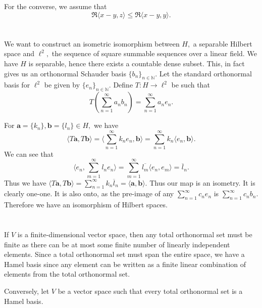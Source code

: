 \documentclass{article}
\begin{document}
For the converse, we assume that $$ \Re \langle x-y,z \rangle \leq  \Re \langle x-y,y \rangle. $$


\section{} %
\section{} %
\section{} %
We want to construct an isometric isomorphism between $H,$ a separable Hilbert space and $\ell^2,$ the sequence of square summable sequences over a linear 
field. We have $H$ is separable, hence there exists a countable dense subset. This, in fact gives us an orthonormal Schauder basis $\{b_n\}_{n \in 
\mathbb{N}}$. Let the standard orthonormal basis for $\ell^2$ be given by $\{e_n\}_{n \in \mathbb{N}}.$ Define $T:H \to \ell^2$ be such that 
$$T(\sum_{n=1}^{\infty}a_n b_n) = \sum_{n=1}^{\infty}a_n e_n.$$

For $\mathbf{a}= \{k_n\}, \mathbf{b}= \{l_n\} \in H,$ we have 
$$	\langle T\mathbf{a}, T \mathbf{b} \rangle =  \langle \sum_{n=1}^{\infty} k_ne_n, \mathbf{b} \rangle = \sum_{n=1}^{\infty} k_n \langle e_n, \mathbf{b} 
\rangle.$$ We can see that $$\langle e_n, \sum_{m=1}^{\infty} l_n e_n \rangle = \sum_{m=1}^{\infty} \overline{l_m} \langle e_n,e_m \rangle = 
\overline{l}_n.$$  Thus we have $\langle T\mathbf{a}, T \mathbf{b} \rangle = \sum_{n=1}^{\infty} k_n \overline{l}_n= \langle \mathbf{a}, \mathbf{b} 
\rangle.$ Thus our map is an isometry. It is clearly one-one. It is also onto, as the pre-image of any $\sum_{n=1}^{\infty} c_n e_n$ is $\sum_{n=1}^{\infty} 
c_n b_n.$ Therefore we have an isomorphism of Hilbert spaces. 
\section{} %
If $V$ is a finite-dimensional vector space, then any total orthonormal set must be finite as there can be at most some finite number of linearly 
independent elements. Since a total orthonormal set must span the entire space, we have a Hamel basis since any element can be written as a finite linear 
combination of elements from the total orthonormal set.

Conversely, let $V$ be a vector space such that every total orthonormal set is a Hamel basis. 
\end{document}
